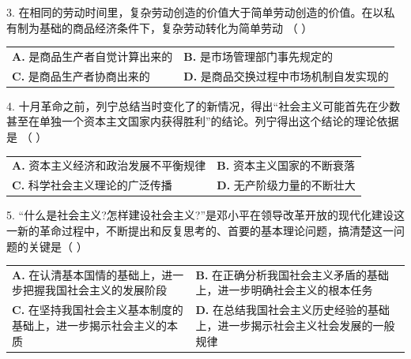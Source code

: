 \documentclass[UTF8,11pt]{ctexart}
\begin{document}
3. 在相同的劳动时间里，复杂劳动创造的价值大于简单劳动创造的价值。在以私有制为基础的商品经济条件下，复杂劳动转化为简单劳动 （    ）


\begin{center}\begin{tabular}{>{\raggedright\arraybackslash}p{\dimexpr(\linewidth-4\tabcolsep)/2\relax}>{\raggedright\arraybackslash}p{\dimexpr(\linewidth-4\tabcolsep)/2\relax}}
\textbf{A.} 是商品生产者自觉计算出来的 & \textbf{B.} 是市场管理部门事先规定的\\[.35em]
\textbf{C.} 是商品生产者协商出来的 & \textbf{D.} 是商品交换过程中市场机制自发实现的\\[.35em]\end{tabular}\end{center}

4. 十月革命之前，列宁总结当时变化了的新情况，得出“社会主义可能首先在少数甚至在单独一个资本主文国家内获得胜利”的结论。列宁得出这个结论的理论依据是 （    ）


\begin{center}\begin{tabular}{>{\raggedright\arraybackslash}p{\dimexpr(\linewidth-4\tabcolsep)/2\relax}>{\raggedright\arraybackslash}p{\dimexpr(\linewidth-4\tabcolsep)/2\relax}}
\textbf{A.} 资本主义经济和政治发展不平衡规律 & \textbf{B.} 资本主义国家的不断衰落\\[.35em]
\textbf{C.} 科学社会主义理论的广泛传播 & \textbf{D.} 无产阶级力量的不断壮大\\[.35em]\end{tabular}\end{center}

5. “什么是社会主义?怎样建设社会主义?”是邓小平在领导改革开放的现代化建设这一新的革命过程中，不断提出和反复思考的、首要的基本理论问题，搞清楚这一问题的关键是（    ）


\begin{center}\begin{tabular}{>{\raggedright\arraybackslash}p{\dimexpr(\linewidth-4\tabcolsep)/2\relax}>{\raggedright\arraybackslash}p{\dimexpr(\linewidth-4\tabcolsep)/2\relax}}
\textbf{A.} 在认清基本国情的基础上，进一步把握我国社会主义的发展阶段 & \textbf{B.} 在正确分析我国社会主义矛盾的基础上，进一步明确社会主义的根本任务\\[.35em]
\textbf{C.} 在坚持我国社会主义基本制度的基础上，进一步揭示社会主义的本质 & \textbf{D.} 在总结我国社会主义历史经验的基础上，进一步揭示社会主义社会发展的一般规律\\[.35em]\end{tabular}\end{center}
\end{document}
